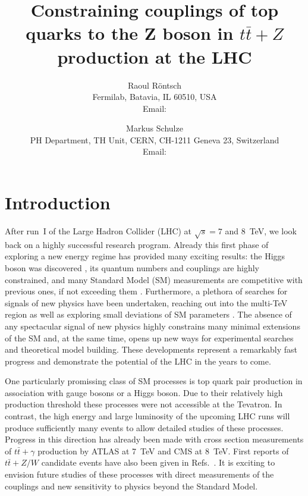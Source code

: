 \documentclass[preprint]{JHEP3} %
\title{Constraining couplings of top quarks to the Z boson in $t\bar{t}+Z$ production at the LHC}
\author{Raoul R\"ontsch \\ Fermilab, Batavia, IL 60510, USA \\
  Email: \email{rontsch@fnal.gov} }
\author{Markus Schulze \\ PH Department, TH Unit, CERN, CH-1211 Geneva 23, Switzerland \\
  Email: \email{markus.schulze@cern.ch} }
\def\ttb{t\bar{t}}
\begin{document}

\section{Introduction}
After run~I of the Large Hadron Collider (LHC) at $\sqrt{s}=7$ and 8~TeV, we look back on a highly successful research program.
Already this first phase of exploring a new energy regime has provided many exciting results: 
the Higgs boson was discovered \cite{}, its quantum numbers and couplings are highly constrained,
and many Standard Model (SM) measurements are competitive with previous ones, if not exceeding them \cite{}.
Furthermore, a plethora of searches for signals of new physics have been undertaken, reaching out into the multi-TeV region as well as
exploring small deviations of SM parameters \cite{}. 
The absence of any spectacular signal of new physics highly constrains many minimal extensions of the SM and, at the same time, 
opens up new ways for %
experimental searches and theoretical model building.
These developments represent a remarkably fast progress and demonstrate the potential of the LHC in the years to come.

One particularly promissing class of SM processes is top quark pair production in association with gauge bosons or a Higgs boson.
Due to their relatively high production threshold these processes were not accessible at the Tevatron. 
In contrast, the high energy and large luminosity of the upcoming LHC runs will produce sufficiently many events to allow detailed studies of these processes.
Progress in this direction has already been made with cross section measurements of $\ttb+\gamma$ production by ATLAS \cite{ATLAS-CONF-2011-153} at 7~TeV  
and CMS \cite{CMS-PAS-TOP-13-011} at 8~TeV. First reports of $\ttb+Z/W$ candidate events have also been given in Refs.~\cite{ATLAS-CONF-2012-126,Chatrchyan:2013qca}.
It is exciting to envision future studies of these processes with direct measurements of the couplings and new sensitivity to physics beyond the Standard Model. 
\end{document}
